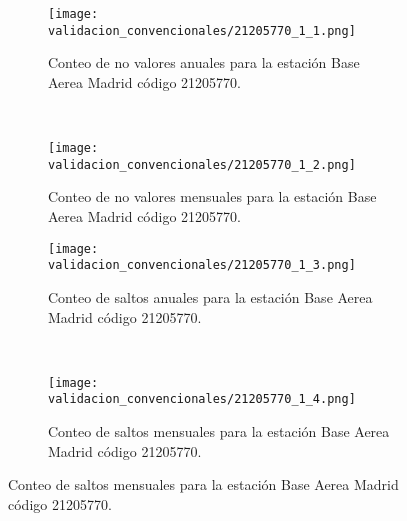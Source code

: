 \begin{figure}[H]\ContinuedFloat
\centering
	\begin{subfigure}[normla]{0.4\textwidth}
	\texttt{[image: validacion\_convencionales/21205770\_1\_1.png]}
		\caption{Conteo de no valores anuales para la estación Base Aerea Madrid código 21205770.}
		\label{subfig:a1}
		\end{subfigure}
		~
    \begin{subfigure}[normla]{0.4\textwidth}
	\texttt{[image: validacion\_convencionales/21205770\_1\_2.png]}
		\caption{Conteo de no valores mensuales para la estación Base Aerea Madrid código 21205770.}
		\label{subfig:a2}
		\end{subfigure}
		
    \begin{subfigure}[normla]{0.4\textwidth}
	\texttt{[image: validacion\_convencionales/21205770\_1\_3.png]}
		\caption{Conteo de saltos anuales para la estación Base Aerea Madrid código 21205770.}
		\label{subfig:a1}
		\end{subfigure}
		~
    \begin{subfigure}[normla]{0.4\textwidth}
	\texttt{[image: validacion\_convencionales/21205770\_1\_4.png]}
		\caption{Conteo de saltos mensuales para la estación Base Aerea Madrid código 21205770.}
		\label{subfig:a2}
		\end{subfigure}

	
\end{figure}
           
\begin{figure}[H]\ContinuedFloat
\centering
\end{figure}
           

